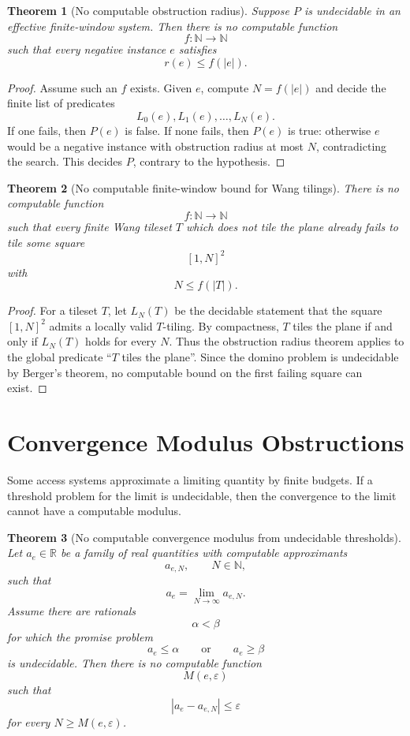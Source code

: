 \documentclass[11pt]{article}
\newtheorem{theorem}{Theorem}[section]
\begin{document}
\begin{theorem}[No computable obstruction radius]
Suppose \(P\) is undecidable in an effective finite-window system. Then there is no computable function
\[
f:\mathbb N\to\mathbb N
\]
such that every negative instance \(e\) satisfies
\[
r(e)\leq f(|e|).
\]
\end{theorem}

\begin{proof}
Assume such an \(f\) exists. Given \(e\), compute \(N=f(|e|)\) and decide the finite list of predicates
\[
L_0(e),L_1(e),\ldots,L_N(e).
\]
If one fails, then \(P(e)\) is false. If none fails, then \(P(e)\) is true: otherwise \(e\) would be a negative instance with obstruction radius at most \(N\), contradicting the search. This decides \(P\), contrary to the hypothesis.
\end{proof}

\begin{theorem}[No computable finite-window bound for Wang tilings]
There is no computable function
\[
f:\mathbb N\to\mathbb N
\]
such that every finite Wang tileset \(T\) which does not tile the plane already fails to tile some square
\[
[1,N]^2
\]
with
\[
N\leq f(|T|).
\]
\end{theorem}

\begin{proof}
For a tileset \(T\), let \(L_N(T)\) be the decidable statement that the square \([1,N]^2\) admits a locally valid \(T\)-tiling. By compactness, \(T\) tiles the plane if and only if \(L_N(T)\) holds for every \(N\). Thus the obstruction radius theorem applies to the global predicate ``\(T\) tiles the plane''. Since the domino problem is undecidable by Berger's theorem, no computable bound on the first failing square can exist.
\end{proof}

\section{Convergence Modulus Obstructions}

Some access systems approximate a limiting quantity by finite budgets. If a threshold problem for the limit is undecidable, then the convergence to the limit cannot have a computable modulus.

\begin{theorem}[No computable convergence modulus from undecidable thresholds]
Let \(a_e\in\mathbb R\) be a family of real quantities with computable approximants
\[
a_{e,N},\qquad N\in\mathbb N,
\]
such that
\[
a_e=\lim_{N\to\infty}a_{e,N}.
\]
Assume there are rationals
\[
\alpha<\beta
\]
for which the promise problem
\[
a_e\leq\alpha
\qquad\text{or}\qquad
a_e\geq\beta
\]
is undecidable. Then there is no computable function
\[
M(e,\varepsilon)
\]
such that
\[
|a_e-a_{e,N}|\leq\varepsilon
\]
for every \(N\geq M(e,\varepsilon)\).
\end{theorem}
\end{document}
